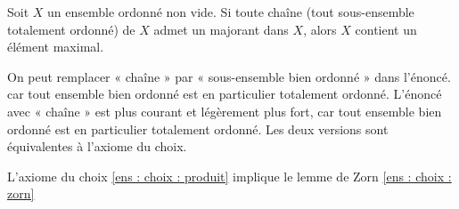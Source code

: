 \begin{definition}\label{ens : choix : zorn}
	Soit $X$ un ensemble ordonné non vide. Si toute chaîne (\ie tout sous-ensemble totalement ordonné) de $X$ admet un majorant dans $X$, alors $X$ contient un élément maximal.
    
\end{definition}

\begin{remarque}
	On peut remplacer « chaîne » par « sous-ensemble bien ordonné » dans l'énoncé. car tout ensemble bien ordonné est en particulier totalement ordonné. L'énoncé avec « chaîne » est plus courant et légèrement plus fort, car tout ensemble bien ordonné est en particulier totalement ordonné. Les deux versions sont équivalentes à l'axiome du choix.
\end{remarque}
\begin{proposition}
    L'axiome du choix \ref{ens : choix : produit} implique le lemme de Zorn \ref{ens : choix : zorn}
\end{proposition}
   
